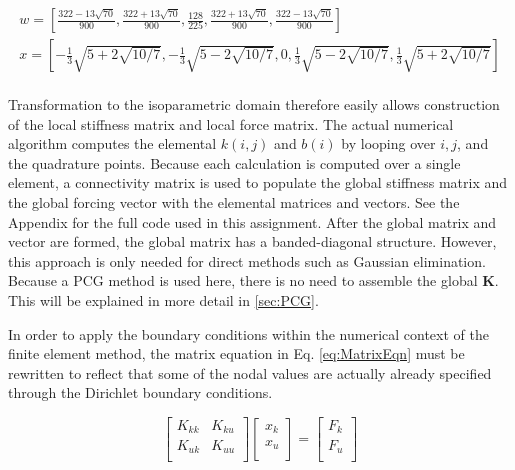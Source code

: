\documentclass[10pt]{article}
\begin{document}
\begin{equation}
\begin{aligned}
w=\left\lbrack\frac{322-13\sqrt{70}}{900}, \frac{322+13\sqrt{70}}{900}, \frac{128}{225}, \frac{322+13\sqrt{70}}{900}, \frac{322-13\sqrt{70}}{900}\right\rbrack\\
x=\left\lbrack-\frac{1}{3}\sqrt{5+2\sqrt{10/7}}, -\frac{1}{3}\sqrt{5-2\sqrt{10/7}}, 0, \frac{1}{3}\sqrt{5-2\sqrt{10/7}}, \frac{1}{3}\sqrt{5+2\sqrt{10/7}}\right\rbrack\\
\end{aligned}
\end{equation} 

Transformation to the isoparametric domain therefore easily allows construction of the local stiffness matrix and local force matrix. The actual numerical algorithm computes the elemental \(k(i,j)\) and \(b(i)\) by looping over \(i, j\), and the quadrature points. Because each calculation is computed over a single element, a connectivity matrix is used to populate the global stiffness matrix and the global forcing vector with the elemental matrices and vectors. See the Appendix for the full code used in this assignment. After the global matrix and vector are formed, the global matrix has a banded-diagonal structure. However, this approach is only needed for direct methods such as Gaussian elimination. Because a PCG method is used here, there is no need to assemble the global \(\textbf{K}\). This will be explained in more detail in \ref{sec:PCG}.

In order to apply the boundary conditions within the numerical context of the finite element method, the matrix equation in Eq. \eqref{eq:MatrixEqn} must be rewritten to reflect that some of the nodal values are actually already specified through the Dirichlet boundary conditions. 

\begin{equation}
\label{eq:condensation}
\begin{bmatrix}
	K_{kk} & K_{ku}\\
	K_{uk} & K_{uu}\\
\end{bmatrix}
\begin{bmatrix}
	x_k\\
	x_u\\
\end{bmatrix}
=
\begin{bmatrix}
	F_k\\
	F_u\\
\end{bmatrix}
\end{equation}
\end{document}
